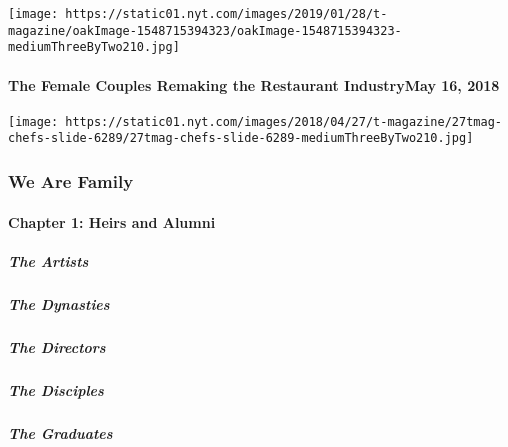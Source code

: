 \texttt{[image: https://static01.nyt.com/images/2019/01/28/t-magazine/oakImage-1548715394323/oakImage-1548715394323-mediumThreeByTwo210.jpg]}
\href{https://www.nytimes.com/2018/05/16/t-magazine/food/female-chefs-rita-sodi-jody-williams-erika-nakamura.html}{}

\hypertarget{the-female-couples-remaking-the-restaurant-industrymay-16-2018}{%
\paragraph{The Female Couples Remaking the Restaurant IndustryMay 16,
2018}\label{the-female-couples-remaking-the-restaurant-industrymay-16-2018}}

\texttt{[image: https://static01.nyt.com/images/2018/04/27/t-magazine/27tmag-chefs-slide-6289/27tmag-chefs-slide-6289-mediumThreeByTwo210.jpg]}

\hypertarget{we-are-family-1}{%
\subsubsection{We Are Family}\label{we-are-family-1}}

\hypertarget{chapter-1-heirs-and-alumni}{%
\paragraph{Chapter 1: Heirs and
Alumni}\label{chapter-1-heirs-and-alumni}}

\href{/interactive/2020/04/13/t-magazine/black-art-galleries.html}{}

\hypertarget{the-artists}{%
\subparagraph{The Artists}\label{the-artists}}

\href{/interactive/2020/04/13/t-magazine/italian-fashion-design-houses.html}{}

\hypertarget{the-dynasties}{%
\subparagraph{The Dynasties}\label{the-dynasties}}

\href{/interactive/2020/04/13/t-magazine/gordon-parks.html}{}

\hypertarget{the-directors}{%
\subparagraph{The Directors}\label{the-directors}}

\href{/interactive/2020/04/13/t-magazine/enrique-olvera-chef.html}{}

\hypertarget{the-disciples}{%
\subparagraph{The Disciples}\label{the-disciples}}

\href{/interactive/2020/04/13/t-magazine/royal-academy-antwerp.html}{}

\hypertarget{the-graduates}{%
\subparagraph{The Graduates}\label{the-graduates}}

